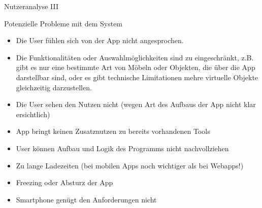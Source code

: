 \documentclass[presentation,bigger,aspectratio=169]{beamer}
\begin{document}
\begin{frame}[label={sec:org408e3c9}]{Nutzeranalyse III}
\begin{block}{Potenzielle Probleme mit dem System}
\begin{itemize}
\item Die User fühlen sich von der App nicht angesprochen.
\item Die Funktionalitäten oder Auswahlmöglichkeiten sind zu
eingeschränkt, z.B. gibt es nur eine bestimmte Art von Möbeln oder
Objekten, die über die App darstellbar sind, oder es gibt technische
Limitationen mehre virtuelle Objekte gleichzeitig darzustellen.
\item Die User sehen den Nutzen nicht (wegen Art des Aufbaus der App nicht
klar ersichtlich)
\item App bringt keinen Zusatznutzen zu bereits vorhandenen Tools
\item User können Aufbau und Logik des Programms nicht nachvollziehen
\item Zu lange Ladezeiten (bei mobilen Apps noch wichtiger als bei Webapps!)
\item Freezing oder Absturz der App
\item Smartphone genügt den Anforderungen nicht
\end{itemize}
\end{block}
\end{frame}
\end{document}
